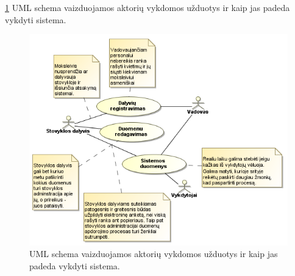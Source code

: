 \ref{fig:uml_tasks2} UML schema vaizduojamos aktorių vykdomos užduotys 
ir kaip jas
padeda vykdyti sistema.

\begin{figure}[h!]
  \begin{center}
    \includegraphics[scale=0.8]{images/sistemos_tiekiama_nauda.png}
  \end{center}
  \caption{UML schema vaizduojamos aktorių vykdomos užduotys ir kaip jas
    padeda vykdyti sistema.}
  \label{fig:uml_tasks2}
\end{figure}
